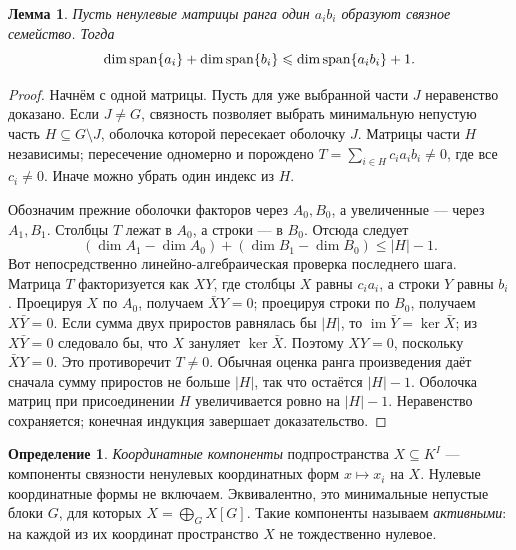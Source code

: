 \documentclass[11pt,a4paper]{article}
\numberwithin{equation}{section}
\theoremstyle{plain}
\newtheorem{lemma}[theorem]{Лемма}
\theoremstyle{definition}
\newtheorem{definition}[theorem]{Определение}
\DeclareMathOperator{\im}{im}\DeclareMathOperator{\supp}{supp}
\newcommand{\leqs}{\leqslant}\newcommand{\geqs}{\geqslant}
\begin{document}
\begin{lemma}\label{lem:connected}
Пусть ненулевые матрицы ранга один $a_i b_i$ образуют связное семейство.
Тогда
\[
 \dim\Span\{a_i\}+\dim\Span\{b_i\}
       \leqs\dim\Span\{a_i b_i\}+1.
\]
\end{lemma}
\begin{proof}
Начнём с одной матрицы. Пусть для уже выбранной части $J$ неравенство
доказано. Если $J\ne G$, связность позволяет выбрать минимальную
непустую часть $H\subseteq G\setminus J$, оболочка которой пересекает
оболочку $J$. Матрицы части $H$ независимы; пересечение одномерно и
порождено $T=\sum_{i\in H}c_i a_i b_i\ne0$, где все $c_i\ne0$.
Иначе можно убрать один индекс из $H$.

Обозначим прежние оболочки факторов через $A_0,B_0$, а увеличенные ---
через $A_1,B_1$. Столбцы $T$ лежат в $A_0$, а строки --- в $B_0$.
Отсюда следует
\[
 (\dim A_1-\dim A_0)+(\dim B_1-\dim B_0)\leqs |H|-1.
\]
Вот непосредственно линейно-алгебраическая проверка последнего шага.
Матрица $T$ факторизуется как $XY$, где столбцы $X$ равны $c_i a_i$,
а строки $Y$ равны $b_i$. Проецируя $X$ по $A_0$, получаем
$\bar X Y=0$; проецируя строки по $B_0$, получаем $X\bar Y=0$.
Если сумма двух приростов равнялась бы $|H|$, то
$\im\bar Y=\ker\bar X$; из $X\bar Y=0$ следовало бы, что $X$ зануляет
$\ker\bar X$. Поэтому $XY=0$, поскольку $\bar X Y=0$.
Это противоречит $T\ne0$. Обычная оценка ранга произведения даёт
сначала сумму приростов не больше $|H|$, так что остаётся $|H|-1$.
Оболочка матриц при присоединении $H$ увеличивается ровно на $|H|-1$.
Неравенство сохраняется; конечная индукция завершает доказательство.
\end{proof}

\begin{definition}
\emph{Координатные компоненты} подпространства $X\subseteq K^I$ ---
компоненты связности ненулевых координатных форм $x\mapsto x_i$ на $X$.
Нулевые координатные формы не включаем. Эквивалентно, это минимальные
непустые блоки $G$, для которых
$X=\bigoplus_G X[G]$.
Такие компоненты называем \emph{активными}: на каждой из их координат
пространство $X$ не тождественно нулевое.
\end{definition}
\end{document}
